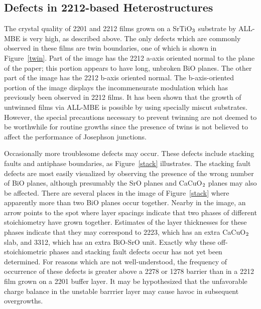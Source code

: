\subsection{Defects in 2212-based Heterostructures}

The crystal quality of 2201 and 2212 films grown on a SrTiO$\rm _3$
substrate by ALL-MBE is very high, as described above.  The only
defects which are commonly observed in these films are twin
boundaries, one of which is shown in Figure~\ref{twin}.  Part of the
image has the 2212 a-axis oriented normal to the plane of the paper;
this portion appears to have long, unbroken BiO planes.  The other
part of the image has the 2212 b-axis oriented normal.  The
b-axis-oriented portion of the image displays the incommensurate
modulation which has previously been observed in 2212
films.\cite{bando} It has been shown that the growth of untwinned
films via ALL-MBE is possible by using specially miscut
substrates.\cite{eckstein3} However, the special precautions necessary
to prevent twinning are not deemed to be worthwhile for routine
growths since the presence of twins is not believed to affect the
performance of Josephson junctions.

Occasionally more troublesome defects may occur.  These defects
include stacking faults and antiphase boundaries, as
Figure~\ref{stack} illustrates.  The stacking fault defects are most
easily visualized by observing the presence of the wrong number of BiO
planes, although presumably the SrO planes and CaCuO$\rm _2$ planes
may also be affected.  There are several places in the image of
Figure~\ref{stack} where apparently more than two BiO planes occur
together.  Nearby in the image, an arrow points to the spot where
layer spacings indicate that two phases of different stoichiometry
have grown together.  Estimates of the layer thicknesses for these
phases indicate that they may correspond to 2223, which has an extra
CaCuO${\rm _2}$ slab, and 3312, which has an extra BiO-SrO
unit.\cite{howell} Exactly why these off-stoichiometric phases and
stacking fault defects occur has not yet been determined.  For reasons
which are not well-understood, the frequency of occurrence of these
defects is greater above a 2278 or 1278 barrier than in a 2212 film
grown on a 2201 buffer layer.  It may be hypothesized that the
unfavorable charge balance in the unstable barrrier
layer\cite{bozovic2} may cause havoc in subsequent overgrowths.

